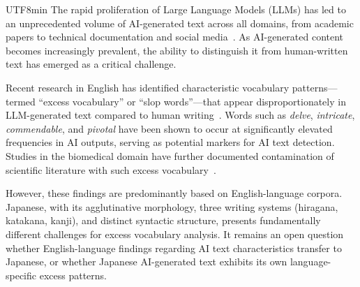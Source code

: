 \documentclass[11pt,a4paper]{article}
\begin{document}
\begin{CJK}{UTF8}{min}
The rapid proliferation of Large Language Models (LLMs) has led to an unprecedented volume of AI-generated text across all domains, from academic papers to technical documentation and social media~\citep{openai2024gpt4, anthropic2025claude}. As AI-generated content becomes increasingly prevalent, the ability to distinguish it from human-written text has emerged as a critical challenge.

Recent research in English has identified characteristic vocabulary patterns---termed ``excess vocabulary'' or ``slop words''---that appear disproportionately in LLM-generated text compared to human writing~\citep{kobak2024vocabulary}. Words such as \textit{delve}, \textit{intricate}, \textit{commendable}, and \textit{pivotal} have been shown to occur at significantly elevated frequencies in AI outputs, serving as potential markers for AI text detection. Studies in the biomedical domain have further documented contamination of scientific literature with such excess vocabulary~\citep{liang2024monitoring, gray2024chatgpt}.

However, these findings are predominantly based on English-language corpora. Japanese, with its agglutinative morphology, three writing systems (hiragana, katakana, kanji), and distinct syntactic structure, presents fundamentally different challenges for excess vocabulary analysis. It remains an open question whether English-language findings regarding AI text characteristics transfer to Japanese, or whether Japanese AI-generated text exhibits its own language-specific excess patterns.


\end{CJK}
\end{document}
